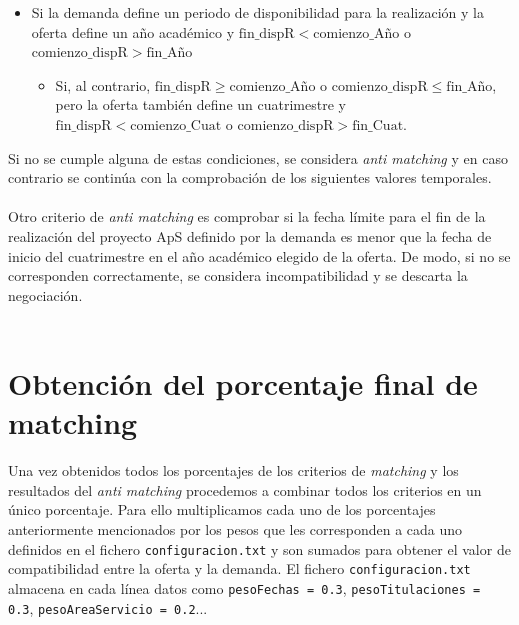 \documentclass[11pt]{book}
\begin{document}
\begin{itemize}
	\item Si la demanda define un periodo de disponibilidad para la
	realización y la oferta define un año académico y
	$\mbox{fin}\_\mbox{dispR} < \mbox{comienzo}\_\mbox{Año}$
	o
	$\mbox{comienzo}\_\mbox{dispR} > \mbox{fin}\_\mbox{Año}$
	\begin{itemize}
		\item Si, al contrario,
		$\mbox{fin}\_\mbox{dispR} \geq \mbox{comienzo}\_\mbox{Año}$
		o
		$\mbox{comienzo}\_\mbox{dispR} \leq \mbox{fin}\_\mbox{Año}$,
		pero la oferta también define un cuatrimestre y
		$\mbox{fin}\_\mbox{dispR} < \mbox{comienzo}\_\mbox{Cuat}$
		o
		$\mbox{comienzo}\_\mbox{dispR} > \mbox{fin}\_\mbox{Cuat}$.
	\end{itemize}
\end{itemize}
 Si no se cumple alguna de estas condiciones, se considera \emph{anti matching} y en caso contrario se continúa con la comprobación de los siguientes valores temporales.\\\\

Otro criterio de \emph{anti matching} es comprobar si la fecha límite para el fin de la realización del proyecto ApS definido por la demanda es menor que la fecha de inicio del cuatrimestre en el año académico elegido de la oferta. De modo, si no se corresponden correctamente, se considera incompatibilidad y se descarta la negociación. \\\\



\section{Obtención del porcentaje final de matching}

Una vez obtenidos todos los porcentajes de los criterios de \emph{matching} y los resultados del \emph{anti matching} procedemos a combinar todos los criterios en un único porcentaje. Para ello multiplicamos cada uno de los porcentajes anteriormente mencionados por los pesos que les corresponden a cada uno definidos en el fichero \texttt{configuracion.txt} y son sumados para obtener el valor de compatibilidad entre la oferta y la demanda. El fichero \texttt{configuracion.txt} almacena en cada línea datos como \texttt{pesoFechas = 0.3}, \texttt{pesoTitulaciones = 0.3}, \texttt{pesoAreaServicio = 0.2}...  \\\\
\end{document}
